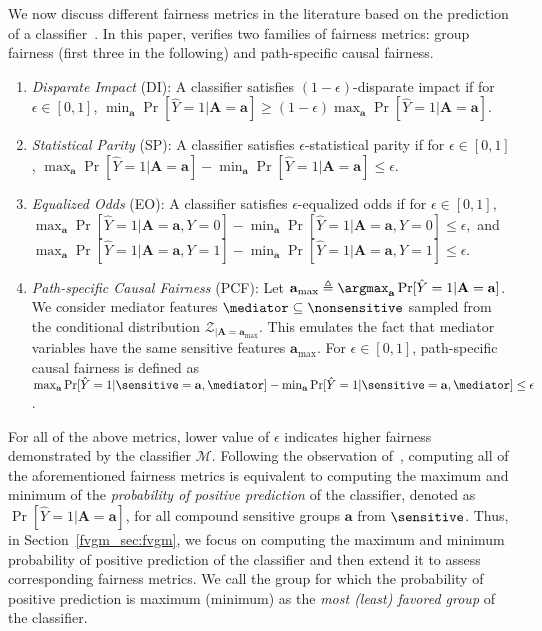  	We now discuss different fairness metrics in the literature based on the prediction of a classifier~\cite{feldman2015certifying,hardt2016equality,nabi2018fair}.  	
 	In this paper, {\fvgm} verifies two families of fairness metrics: group fairness (first three in the following) and path-specific causal fairness.

 	\begin{enumerate}[leftmargin=*]
 		\itemsep0em 
 		\item \textit{Disparate Impact} (DI): A classifier  satisfies $(1 - \epsilon)$-disparate impact if for $\epsilon \in [0,1] $,
 		$
 		\min_{\mathbf{a}} \Pr[\hat{Y} =1 | \mathbf{A} =  \mathbf{a}]  \ge (1 - \epsilon) \max_{\mathbf{a}} \Pr[\hat{Y} =1 | \mathbf{A} =  \mathbf{a}].
 		$
 		\item \textit{Statistical Parity} (SP): A classifier satisfies $\epsilon$-statistical parity if for $\epsilon \in [0,1] $, 
 		$
 		\max_{\mathbf{a}} \Pr[\hat{Y} =1 | \mathbf{A} =  \mathbf{a}] - \min_{\mathbf{a}} \Pr[\hat{Y} =1 | \mathbf{A} =  \mathbf{a}] \le \epsilon.
 		$
 		\item \textit{Equalized Odds} (EO): 	A classifier satisfies $\epsilon$-equalized odds if for $\epsilon \in [0,1] $,
 		$ \max_{\mathbf{a}}\Pr[\hat{Y} =1 |\mathbf{A}= \mathbf{a}, Y= 0  ] - \min_{\mathbf{a}}\Pr [\hat{Y} = 1|\mathbf{A}= \mathbf{a}, Y = 0] \le \epsilon, $ and $
 		\max_{\mathbf{a}}\Pr[\hat{Y} =1 |\mathbf{A}= \mathbf{a}, Y= 1  ] - \min_{\mathbf{a}}\Pr [\hat{Y} = 1|\mathbf{A}= \mathbf{a}, Y = 1] \le \epsilon.
 		$
 		\item \textit{Path-specific Causal Fairness} (PCF): 
 		Let $ \mathbf{a}_{\max}  \triangleq \argmax_{ \mathbf{a}} \Pr[\hat{Y} =1 |\mathbf{A}=  \mathbf{a}] $. We consider mediator features $ \mediator \subseteq \nonsensitive $ sampled from the conditional distribution $ {\mathcal{Z}_{|\mathbf{A} = \mathbf{a}_{\max}}} $. This emulates the fact that mediator variables have the same sensitive features $ \mathbf{a}_{\max} $.  For $ \epsilon \in [0,1] $,  path-specific causal fairness is defined as 
 		$
 		\max_{\mathbf{a}}\Pr[\hat{Y} = 1 | \sensitive =  \mathbf{a}, \mediator] - \min_{\mathbf{a}}\Pr[\hat{Y} = 1 | \sensitive = \mathbf{a}, \mediator ] \le \epsilon
 		$.
 	\end{enumerate}

 	  For all of the above metrics, lower value of $\epsilon$ indicates higher fairness demonstrated by the classifier $\mathcal{M}$. Following the observation of~\cite{ghosh2020justicia},  computing all of the aforementioned fairness metrics is equivalent to computing the maximum and minimum of the \textit{probability of positive prediction} of the classifier, denoted as $\Pr[\hat{Y}=1|\mathbf{A} =\mathbf{a}]$, for all compound sensitive groups $\mathbf{a}$ from $ \sensitive $. Thus, in Section~\ref{fvgm_sec:fvgm}, we focus on computing the maximum and minimum probability of positive prediction of the classifier and then extend it to assess corresponding fairness metrics. We call the group for which the probability of positive prediction is maximum (minimum) as the \textit{most (least) favored group} of the classifier.
 
